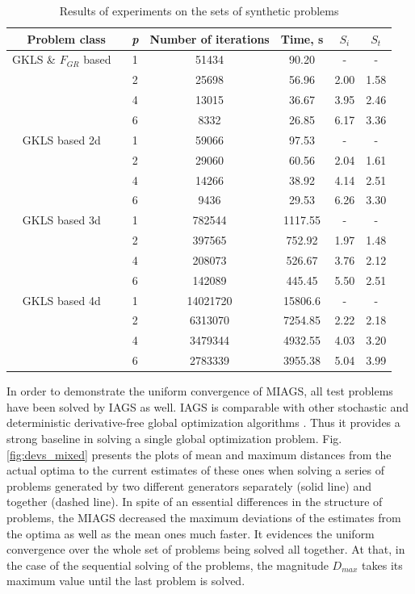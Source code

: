 \documentclass[runningheads]{llncs}
\begin{document}
\begin{table}
  \centering
  \caption{Results of experiments on the sets of synthetic problems}
  \label{tab:speedup}
  \begin{tabular}{c|c|cccc}
    Problem class & \textit{p} & Number of iterations & Time, s & \(S_i\) & \(S_t\)   \\
    \hline
    GKLS \& \(F_{GR}\) based \
      & 1 & 51434 & 90.20 & -    & - \\
      & 2 & 25698 & 56.96 & 2.00 & 1.58 \\
      & 4 & 13015 & 36.67 & 3.95 & 2.46 \\
      & 6 & 8332  & 26.85 & 6.17 & 3.36 \\
    \hline
    GKLS based 2d \
      & 1 & 59066 & 97.53 & -    & - \\
      & 2 & 29060 & 60.56 & 2.04 & 1.61 \\
      & 4 & 14266 & 38.92 & 4.14 & 2.51 \\
      & 6 & 9436  & 29.53 & 6.26 & 3.30 \\
    \hline
    GKLS based 3d \
      & 1 & 782544 & 1117.55 & -    & - \\
      & 2 & 397565 & 752.92  & 1.97 & 1.48 \\
      & 4 & 208073 & 526.67  & 3.76 & 2.12 \\
      & 6 & 142089 & 445.45  & 5.50 & 2.51 \\
    \hline
    GKLS based 4d \
      & 1 & 14021720 & 15806.6 & -    & - \\
      & 2 & 6313070 & 7254.85  & 2.22 & 2.18 \\
      & 4 & 3479344 & 4932.55  & 4.03 & 3.20 \\
      & 6 & 2783339 & 3955.38  & 5.04 & 3.99 \\
    \hline
  \end{tabular}
\end{table}

In order to demonstrate the uniform convergence of MIAGS, all test problems have been solved by IAGS as well.
IAGS is comparable with other stochastic and deterministic derivative-free global optimization algorithms \cite{Sovrasov2019}. Thus it
provides a strong baseline in solving a single global optimization problem.
Fig. \ref{fig:devs_mixed} presents the plots of mean and maximum distances from the actual
optima to the current estimates of these ones when solving a series of problems generated by
two different generators separately (solid line) and together (dashed line).
In spite of an essential differences in the structure of problems, the MIAGS decreased
the maximum deviations of the estimates from the optima as well as the mean ones much faster.
It evidences the uniform convergence over the whole set of problems being solved all together.
At that, in the case of the sequential solving of the problems, the magnitude \(D_{max}\) takes
its maximum value until the last problem is solved.
\end{document}
